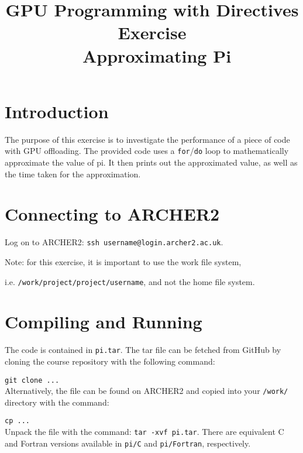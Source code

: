 \documentclass{article}
\title{GPU Programming with Directives Exercise \\\ Approximating Pi}
\author{}
\date{}
\begin{document}
\maketitle

\section{Introduction}

The purpose of this exercise is to investigate the performance of a piece of code with GPU offloading. The provided code uses a \texttt{for}/\texttt{do} loop to mathematically approximate the value of pi. It then prints out the approximated value, as well as the time taken for the approximation. 
 


\section{Connecting to ARCHER2}

Log on to ARCHER2: \texttt{ssh username@login.archer2.ac.uk}. 

\noindent Note: for this exercise, it is important to use the work file system, 

\noindent i.e. \texttt{/work/project/project/username}, and not the home file system.



\section{Compiling and Running}

The code is contained in \texttt{pi.tar}. The tar file can be fetched from GitHub by cloning the course repository with the following command:

\texttt{git clone ...} \\

\noindent Alternatively, the file can be found on ARCHER2 and copied into your \texttt{/work/} directory with the command:

\texttt{cp ...} \\

\noindent Unpack the file with the command: \texttt{tar -xvf pi.tar}. There are equivalent C and Fortran versions available in \texttt{pi/C} and \texttt{pi/Fortran}, respectively.\\
\end{document}

